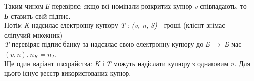 Таким чином \textit{Б} перевіряє: якщо всі номінали розкритих купюр \textit{v} співпадають, то \textit{Б} ставить свій підпис.\\
Потім \textit{K} надсилає електронну купюру \textit{T} :\textit{ (v, n, S)} - гроші (клієнт знімає сліпучий множник).\\
\textit{T} перевіряє підпис банку та надсилає свою електронну купюру до \textit{Б} $ \rightarrow $ \textit{Б} має $(v, n), n_{K}=n_{T}$.\\
Ще один варіант шахрайства: \textit{K} і \textit{T} можуть надіслати купюру з однаковим $n$. Для цього існує реєстр використованих купюр.\\
